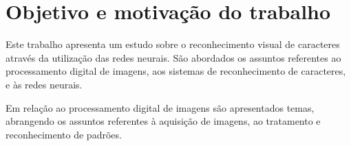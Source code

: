\section{Objetivo e motivação do trabalho}
	Este trabalho apresenta um estudo sobre o reconhecimento visual de caracteres através da utilização das redes neurais. São abordados os assuntos referentes ao processamento digital de imagens, aos sistemas de reconhecimento de caracteres, e às redes neurais.
	
	Em relação ao processamento digital de imagens são apresentados temas, abrangendo os assuntos referentes à aquisição de imagens, ao tratamento e reconhecimento de padrões.